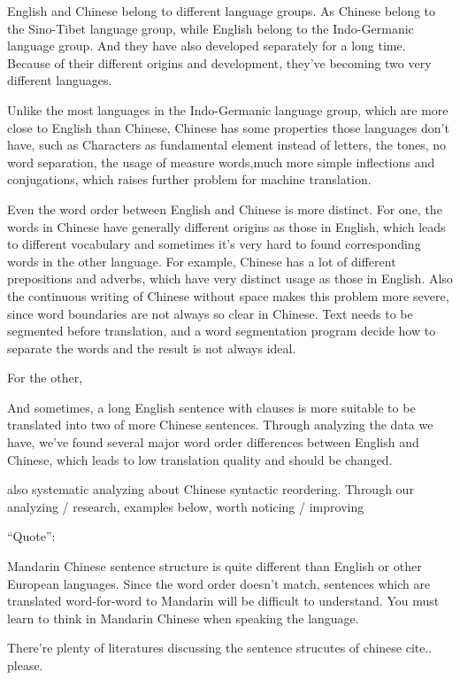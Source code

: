 English and Chinese belong to different language groups. As Chinese belong to the Sino-Tibet language group, while English belong to the Indo-Germanic language group. And they have also developed separately for a long time. Because of their different origins and development, they've becoming two very different languages.

Unlike the most languages in the Indo-Germanic language group, which are more close to English than Chinese, Chinese has some properties those languages don't have, such as Characters as fundamental element instead of letters, the tones, no word separation, the usage of measure words,much more simple inflections and conjugations, which raises further problem for machine translation.

Even the word order between English and Chinese is more distinct. For one, the words in Chinese have generally different origins as those in English, which leads to different vocabulary and sometimes it's very hard to found corresponding words in the other language. For example, Chinese has a lot of different prepositions and adverbs, which have very distinct usage as those in English. Also the continuous writing of Chinese without space makes this problem more severe, since word boundaries are not always so clear in Chinese. Text needs to be segmented before translation, and a word segmentation program decide how to separate the words and the result is not always ideal.

For the other, 

And sometimes, a long English sentence with clauses is more suitable to be translated into two of more Chinese sentences. Through analyzing the data we have, we've found several major word order differences between English and Chinese, which leads to low translation quality and should be changed. 


\cite{syntactic} also systematic analyzing about Chinese syntactic reordering. Through our analyzing / research, examples below, worth noticing / improving

``Quote'':


Mandarin Chinese sentence structure is quite different than English or other European languages. Since the word order doesn't match, sentences which are translated word-for-word to Mandarin will be difficult to understand. You must learn to think in Mandarin Chinese when speaking the language. 

There're plenty of literatures discussing the sentence strucutes of chinese cite.. please.

